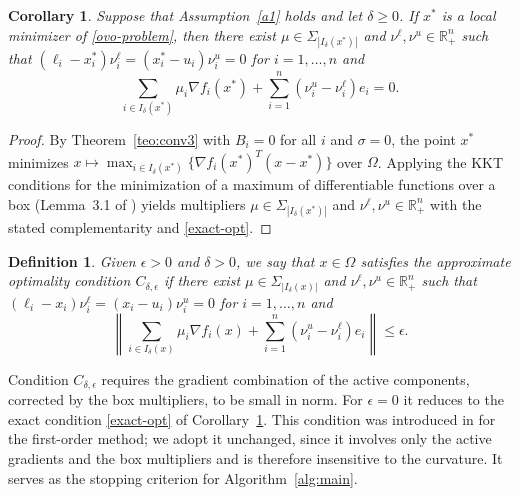 \documentclass[11pt]{article}
\newtheorem{corollary}[theorem]{Corollary}
\newtheorem{definition}[theorem]{Definition}
\newcounter{alg}[section]
\begin{document}
\begin{corollary} \label{cor:exact}
Suppose that Assumption~\ref{a1} holds and let $\delta \geq 0$. If $x^*$ is a
local minimizer of \eqref{ovo-problem}, then there exist
$\mu \in \Sigma_{|I_\delta(x^*)|}$ and $\nu^\ell, \nu^u \in \mathbb{R}^n_+$ such
that $(\ell_i - x^*_i)\nu^\ell_i = (x^*_i - u_i)\nu^u_i = 0$ for
$i = 1, \ldots, n$ and
\begin{equation} \label{exact-opt}
\sum_{i \in I_\delta(x^*)} \mu_i \nabla f_i(x^*)
+ \sum_{i=1}^n (\nu^u_i - \nu^\ell_i) e_i = 0.
\end{equation}
\end{corollary}

\begin{proof}
By Theorem~\ref{teo:conv3} with $B_i = 0$ for all $i$ and $\sigma = 0$, the
point $x^*$ minimizes
$x \mapsto \max_{i \in I_\delta(x^*)} \{ \nabla f_i(x^*)^T(x - x^*) \}$ over
$\Omega$. Applying the KKT conditions for the minimization of a maximum of
differentiable functions over a box (Lemma~3.1 of \cite{alvarezovo}) yields
multipliers $\mu \in \Sigma_{|I_\delta(x^*)|}$ and
$\nu^\ell, \nu^u \in \mathbb{R}^n_+$ with the stated complementarity and
\eqref{exact-opt}.
\end{proof}

\begin{definition} \label{def:optcond}
Given $\epsilon > 0$ and $\delta > 0$, we say that $x \in \Omega$ satisfies the
\textit{approximate optimality condition} $C_{\delta,\epsilon}$ if there exist
$\mu \in \Sigma_{|I_\delta(x)|}$ and $\nu^\ell, \nu^u \in \mathbb{R}^n_+$ such
that $(\ell_i - x_i)\nu^\ell_i = (x_i - u_i)\nu^u_i = 0$ for $i = 1, \ldots, n$
and
\begin{equation} \label{miaprox-box}
\left\| \sum_{i \in I_\delta(x)} \mu_i \nabla f_i(x)
+ \sum_{i=1}^{n} (\nu^u_i - \nu^\ell_i) e_i \right\| \leq \epsilon.
\end{equation}
\end{definition}

Condition $C_{\delta,\epsilon}$ requires the gradient combination of the active
components, corrected by the box multipliers, to be small in norm. For
$\epsilon = 0$ it reduces to the exact condition \eqref{exact-opt} of
Corollary~\ref{cor:exact}. This condition was introduced in \cite{alvarezovo}
for the first-order method; we adopt it unchanged, since it involves only the
active gradients and the box multipliers and is therefore insensitive to the
curvature. It serves as the stopping criterion for
Algorithm~\ref{alg:main}.
\end{document}
